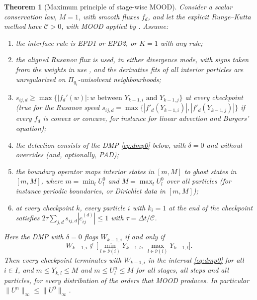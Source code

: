 \documentclass[11pt,a4paper]{article}
\theoremstyle{plain}
\newtheorem{theorem}{Theorem}[section]
\theoremstyle{definition}
\theoremstyle{remark}
\numberwithin{equation}{section}
\newcommand{\cnb}{\bar\nu}
\newcommand{\Csp}{\mathcal{C}}
\newcommand{\A}[1]{\cite[#1]{Addendum}}
\begin{document}
\begin{theorem}[Maximum principle of stage-wise MOOD]\label{thm:maxprinciple}
Consider a scalar conservation law, $M=1$, with smooth fluxes $f_d$, and let the explicit Runge--Kutta method have $\Csp>0$, with MOOD applied by \A{Alg.~1}. Assume:
\begin{enumerate}[label=(M\arabic*)]
\item the interface rule is EPD1 or EPD2, or $K=1$ with any rule;
\item the aligned Rusanov flux is used, in either divergence mode, with signs taken from the weights in use \A{Rem.~5.5}, and the derivative fits of all interior particles are unregularized on $\Pi_{q_i}$-unisolvent neighbourhoods;
\item $s_{ij,d}\ge\max\{|f_d'(w)|: w \text{ between } Y_{k-1,i} \text{ and } Y_{k-1,j}\}$ at every checkpoint (true for the Rusanov speed $s_{ij,d}=\max\{|f'_d(Y_{k-1,i})|,|f'_d(Y_{k-1,j})|\}$ if every $f_d$ is convex or concave, for instance for linear advection and Burgers' equation);
\item the detection consists of the DMP \eqref{eq:dmp0} below, with $\delta=0$ and without overrides (and, optionally, PAD);
\item the boundary operator maps interior states in $[m,M]$ to ghost states in $[m,M]$, where $m=\min_lU^0_l$ and $M=\max_lU^0_l$ over all particles (for instance periodic boundaries, or Dirichlet data in $[m,M]$);
\item at every checkpoint $k$, every particle $i$ with $k_i=1$ at the end of the checkpoint satisfies $2\tau\sum_{j,d}s_{ij,d}|c^{(d)}_{ij}|\le1$ with $\tau=\Delta t/\Csp$.
\end{enumerate}
Here the DMP with $\delta=0$ flags $W_{k-1,i}$ if and only if
\begin{equation}\label{eq:dmp0}
W_{k-1,i}\notin\Big[\min_{l\in\cnb(i)}Y_{k-1,l},\ \max_{l\in\cnb(i)}Y_{k-1,l}\Big].
\end{equation}
Then every checkpoint terminates with $W_{k-1,i}$ in the interval \eqref{eq:dmp0} for all $i\in I$, and $m\le Y_{k,l}\le M$ and $m\le U^n_l\le M$ for all stages, all steps and all particles, for every distribution of the orders that MOOD produces. In particular $\|U^n\|_\infty\le\|U^0\|_\infty$.
\end{theorem}
\end{document}
